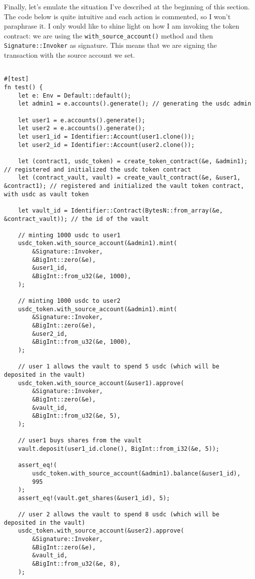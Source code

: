\documentclass{article}
\newcommand{\inl}[1]{\lstinline{#1}}
\begin{document}
Finally, let's emulate the situation I've described at the beginning of this section. The code below is quite intuitive and each action is commented, so I won't paraphrase it. I only would like to shine light on how I am invoking the token contract: we are using the \inl{with_source_account()} method and then \inl{Signature::Invoker} as signature. This means that we are signing the transaction with the source account we set.

\begin{lstlisting}
  
#[test]
fn test() {
    let e: Env = Default::default();
    let admin1 = e.accounts().generate(); // generating the usdc admin

    let user1 = e.accounts().generate();
    let user2 = e.accounts().generate();
    let user1_id = Identifier::Account(user1.clone());
    let user2_id = Identifier::Account(user2.clone());

    let (contract1, usdc_token) = create_token_contract(&e, &admin1); // registered and initialized the usdc token contract
    let (contract_vault, vault) = create_vault_contract(&e, &user1, &contract1); // registered and initialized the vault token contract, with usdc as vault token

    let vault_id = Identifier::Contract(BytesN::from_array(&e, &contract_vault)); // the id of the vault

    // minting 1000 usdc to user1
    usdc_token.with_source_account(&admin1).mint(
        &Signature::Invoker,
        &BigInt::zero(&e),
        &user1_id,
        &BigInt::from_u32(&e, 1000),
    );

    // minting 1000 usdc to user2
    usdc_token.with_source_account(&admin1).mint(
        &Signature::Invoker,
        &BigInt::zero(&e),
        &user2_id,
        &BigInt::from_u32(&e, 1000),
    );

    // user 1 allows the vault to spend 5 usdc (which will be deposited in the vault)
    usdc_token.with_source_account(&user1).approve(
        &Signature::Invoker,
        &BigInt::zero(&e),
        &vault_id,
        &BigInt::from_u32(&e, 5),
    );

    // user1 buys shares from the vault
    vault.deposit(user1_id.clone(), BigInt::from_i32(&e, 5));

    assert_eq!(
        usdc_token.with_source_account(&admin1).balance(&user1_id),
        995
    );
    assert_eq!(vault.get_shares(&user1_id), 5);

    // user 2 allows the vault to spend 8 usdc (which will be deposited in the vault)
    usdc_token.with_source_account(&user2).approve(
        &Signature::Invoker,
        &BigInt::zero(&e),
        &vault_id,
        &BigInt::from_u32(&e, 8),
    );


\end{lstlisting}
\end{document}
